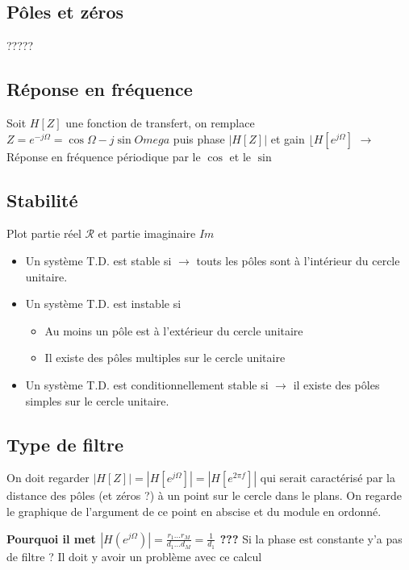 \documentclass{article}
\theoremstyle{plain}%
\theoremstyle{definition}
\theoremstyle{remark}
\begin{document}
\subsection{Pôles et zéros}
?????

\subsection{Réponse en fréquence}
Soit $ H[Z] $ une fonction de transfert, on remplace $ Z = e^{-j \Omega } = \cos \Omega - j \sin Omega $ puis phase $ \left| H[Z] \right|  $ et gain $ \lfloor H[e^{j \Omega }] $ 
$\rightarrow$ Réponse en fréquence périodique par le $ \cos  $ et le $ \sin  $ 


\subsection{Stabilité}
Plot partie réel $ \mathcal{R} $ et partie imaginaire $ Im $ 
\begin{itemize}
    \item Un système T.D. est stable si $\rightarrow$ touts les pôles sont à l'intérieur du cercle unitaire.
    \item Un système T.D. est instable si \begin{itemize}
        \item Au moins un pôle est à l'extérieur du cercle unitaire
        \item Il existe des pôles multiples sur le cercle unitaire
    \end{itemize}
    \item Un système T.D. est conditionnellement stable si $\rightarrow$ il existe des pôles simples sur le cercle unitaire.
\end{itemize}

\subsection{Type de filtre}
On doit regarder $ \left| H[Z] \right| = \left| H[e^{j \Omega }] \right| = \left| H[e^{2 \pi f}] \right| $ qui serait caractérisé par la distance des pôles (et zéros ?) à un point sur le cercle dans le plans. On regarde le graphique de l'argument de ce point en abscise et du module en ordonné.

\textbf{Pourquoi il met $ \left| H(e^{j \Omega }) \right|  = \frac{r_1\dots r_M}{d_1\dots d_M} = \frac{1}{d_1}$ ??? } Si la phase est constante y'a pas de filtre ? Il doit y avoir un problème avec ce calcul
\end{document}
